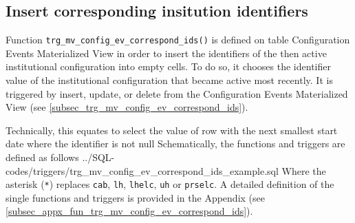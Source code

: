 \subsection{Insert corresponding insitution identifiers}\label{subsec_fun_trg_mv_config_ev_correspond_ids}

Function \texttt{trg\_mv\_config\_ev\_correspond\_ids()} is defined on table Configuration Events Materialized View in order to insert the identifiers of the then active institutional configuration into empty cells.
To do so, it chooses the identifier value of the institutional configuration that became active most recently. 
It is triggered by insert, update, or delete from the Configuration Events Materialized View (see \ref{subsec_trg_mv_config_ev_correspond_ids}).

Technically, this equates to select the value of row with the next smallest start date where the identifier is not null
Schematically, the functions and triggers are defined as follows
%
{../SQL-codes/triggers/trg_mv_config_ev_correspond_ids_example.sql}
Where the asterisk (\texttt{*}) replaces \texttt{cab}, \texttt{lh}, \texttt{lhelc}, \texttt{uh} or \texttt{prselc}.
A detailed definition of the single functions and triggers is provided in the Appendix (see \ref{subsec_appx_fun_trg_mv_config_ev_correspond_ids}).
